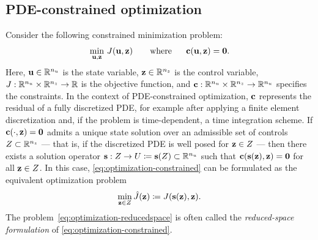 \subsection{PDE-constrained optimization}
\label{sec:optimization}

Consider the following constrained minimization problem:
\begin{align}
    \label{eq:optimization-constrained}
    \begin{aligned}
    \min_{\mathbf{u},\mathbf{z}} ~& J(\mathbf{u},\mathbf{z})
    \qquad
    \text{where}~~& \mathbf{c}(\mathbf{u},\mathbf{z}) = \mathbf{0}.
    \end{aligned}
\end{align}
Here, $\mathbf{u}\in\mathbb{R}^{n_u}$ is the state variable, $\mathbf{z}\in\mathbb{R}^{n_z}$ is the control variable, $J:\mathbb{R}^{n_u}\times\mathbb{R}^{n_z}\to\mathbb{R}$ is the objective function, and $\mathbf{c}:\mathbb{R}^{n_u}\times\mathbb{R}^{n_z}\to\mathbb{R}^{n_u}$ specifies the constraints.
In the context of PDE-constrained optimization, $\mathbf{c}$ represents the residual of a fully discretized PDE, for example after applying a finite element discretization and, if the problem is time-dependent, a time integration scheme.
If $\mathbf{c}(\cdot,\mathbf{z})=\mathbf{0}$ admits a unique state solution over an admissible set of controls $Z \subset\mathbb{R}^{n_z}$ --- that is, if the discretized PDE is well posed for $\mathbf{z}\in Z$ --- then there exists a solution operator $\mathbf{s}:Z\to U \coloneqq \mathbf{s}(Z) \subset \mathbb{R}^{n_u}$ such that $\mathbf{c}(\mathbf{s}(\mathbf{z}),\mathbf{z})=\mathbf{0}$ for all $\mathbf{z}\in Z$.
In this case, \cref{eq:optimization-constrained} can be formulated as the equivalent optimization problem
\begin{align}
    \label{eq:optimization-reducedspace}
    \min_{\mathbf{z}\in Z} \hat{J}(\mathbf{z})
    \coloneqq J(\mathbf{s}(\mathbf{z}),\mathbf{z}).
\end{align}
The problem~\cref{eq:optimization-reducedspace} is often called the \emph{reduced-space formulation} of \cref{eq:optimization-constrained}.

